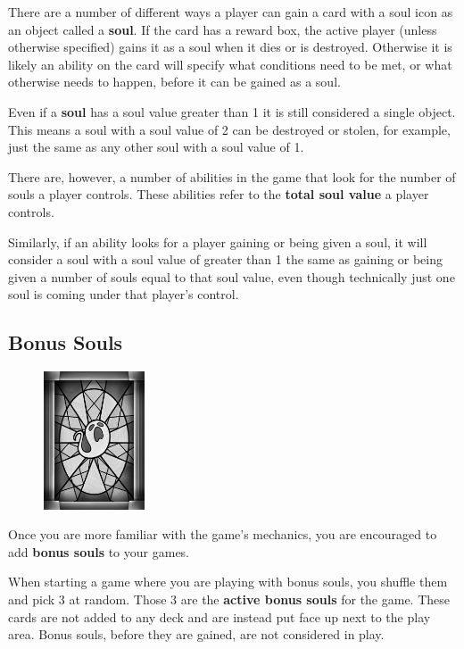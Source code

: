 \documentclass[a4paper, twoside]{report} %
\begin{document}
    There are a number of different ways a player can gain a card with a soul icon as an object called a \textbf{soul}. If the card has a reward box, the active player (unless otherwise specified) gains it as a soul when it dies or is destroyed. Otherwise it is likely an ability on the card will specify what conditions need to be met, or what otherwise needs to happen, before it can be gained as a soul.

    Even if a \textbf{soul} has a soul value greater than 1 it is still considered a single object. This means a soul with a soul value of 2 can be destroyed or stolen, for example, just the same as any other soul with a soul value of 1.

    There are, however, a number of abilities in the game that look for the number of souls a player controls. These abilities refer to the \textbf{total soul value} a player controls.

    Similarly, if an ability looks for a player gaining or being given a soul, it will consider a soul with a soul value of greater than 1 the same as gaining or being given a number of souls equal to that soul value, even though technically just one soul is coming under that player’s control.

    \subsection{Bonus Souls}
    \begin{figure}
        \centering
        \includegraphics[width=30mm]{assets/bonus_soul.png}
    \end{figure}
    Once you are more familiar with the game’s mechanics, you are encouraged to add \textbf{bonus souls} to your games.

    When starting a game where you are playing with bonus souls, you shuffle them and pick 3 at random. Those 3 are the \textbf{active bonus souls} for the game. These cards are not added to any deck and are instead put face up next to the play area. Bonus souls, before they are gained, are not considered in play.
\end{document}
